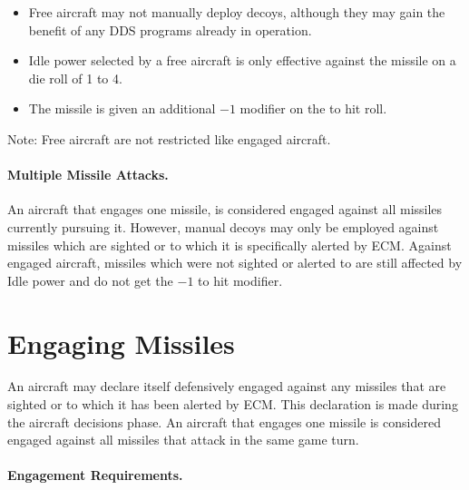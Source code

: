 {\begin{itemize}


    \item Free aircraft may not manually deploy decoys, although they may gain the benefit of any DDS programs already in operation.

    \item Idle power selected by a free aircraft is only effective against the missile on a die roll of 1 to 4.

    \item The missile is given an additional $-1$ modifier on the to hit roll.

\end{itemize}

Note: Free aircraft are not restricted like engaged aircraft.

\paragraph{Multiple Missile Attacks.} An aircraft that engages one missile, is considered engaged against all missiles currently pursuing it. However, manual decoys may only be employed against missiles which are sighted or to which it is specifically alerted by ECM. Against engaged aircraft, missiles which were not sighted or alerted to are still affected by Idle power and do not get the $-1$ to hit modifier.


}{

\section{Engaging Missiles}
\label{rule:engaging-missiles}

An aircraft may declare itself defensively engaged against any missiles that are sighted or to which it has been alerted by ECM. This declaration is made during the aircraft decisions phase. An aircraft that engages one missile is considered engaged against all missiles that attack in the same game turn. 


\paragraph{Engagement Requirements.} 

}
